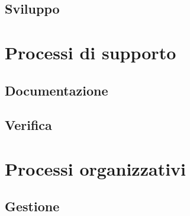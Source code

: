 \documentclass[a4paper,titlepage]{article}
\begin{document}
 \subsection{Sviluppo}
  
\section{Processi di supporto}
 \subsection{Documentazione}

 
 \subsection{Verifica}
  
\section{Processi organizzativi}
 \subsection{Gestione}
  
\end{document}
